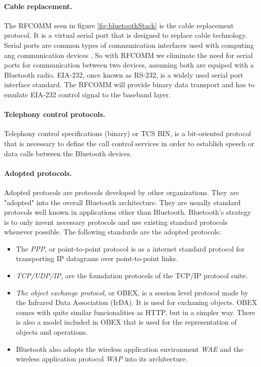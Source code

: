 \documentclass[a4paper, 11pt]{report}
\begin{document}
		\paragraph{Cable replacement.}
The RFCOMM seen in figure \ref{fig:bluetoothStack} is the cable replacement protocol. It is a virtual serial port that is designed to replace cable technology. Serial ports are common types of communication interfaces used with computing ang communication devices \cite{introBluetooth}. So with RFCOMM we eliminate the need for serial ports for communication between two devices, assuming both are equiped with a Bluetooth radio. 
EIA-232, once known as RS-232, is a widely used serial port interface standard. The RFCOMM will provide binary data transport and has to emulate EIA-232 control signal to the baseband layer.

		\paragraph{Telephony control protocols.}
Telephony control specifications (binary) or TCS BIN, is a bit-oriented protocol that is necessary to define the call control services in order to establish speech or data calls between the Bluetooth devices.

		\paragraph{Adopted protocols.}
Adopted protocols are protocols developed by other organizations. They are "adopted" into the overall Bluetooth architecture. They are usually standard protocols well known in applications other than Bluetooth. Bluetooth's strategy is to only invent necessary protocols and use existing standard protocols whenever possible. The following standards are the adopted protocols:

	\begin{itemize}
		\item The \textit{PPP}, or point-to-point protocol is as a internet standard protocol for transporting IP datagrams over point-to-point links.
		\item \textit{TCP/UDP/IP}, are the foundation protocols of the TCP/IP protocol suite.
		\item \textit{The object exchange protocol}, or OBEX, is a session level protocol made by the Infrared Data Association (IrDA). It is used for exchaning objects. OBEX comes with quite similar funcionalities as HTTP, but in a simpler way. There is also a model included in OBEX that is used for the representation of objects and operations.
		\item Bluetooth also adopts the wireless application environment \textit{WAE} and the wireless application protocol \textit{WAP} into its architecture.	
	\end{itemize}
\end{document}
